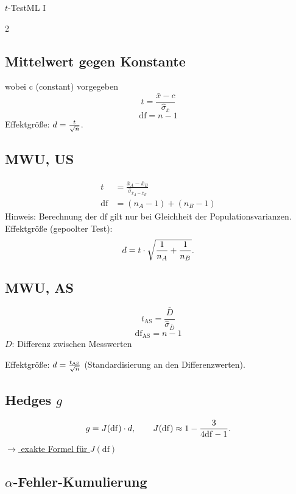 
\begin{formulaBox}{\texorpdfstring{$t$-Test}{t-Test}}{ML I}

\begin{multicols}{2}

\subsection*{Mittelwert gegen Konstante} 
wobei c (constant) vorgegeben
$$t=\frac{\bar{x}-c}{\hat{\sigma}_{\bar{x}}}$$
$$\mathrm{df}=n-1$$
Effektgröße: $d=\frac{t}{\sqrt{n}}$.

\subsection*{MWU, US} 

\begin{align*}
t&=\frac{\bar{x}_A-\bar{x}_B}{\hat{\sigma}_{\bar{x}_A-\bar{x}_B}}\\
\mathrm{df}&=(n_A-1)+(n_B-1)
\end{align*}
Hinweis: Berechnung der $\mathrm{df}$ gilt nur bei Gleichheit der Populationsvarianzen. 
Effektgröße (gepoolter Test):
\[
d=t\cdot\sqrt{\frac{1}{n_A}+\frac{1}{n_B}}.
\]

\subsection*{\textbf{MWU, AS}}
$$t_{\mathrm{AS}}=\frac{\bar{D}}{\hat{\sigma}_{\bar{D}}}$$
$$\mathrm{df}_{\mathrm{AS}}=n-1$$
$D$: Differenz zwischen Messwerten
\par Effektgröße: $d=\frac{t_{\mathrm{AS}}}{\sqrt{n}}$ (Standardisierung an den Differenzwerten).

\columnbreak
\subsection*{\textbf{Hedges $g$}}
\[
g=J(\mathrm{df})\cdot d,\qquad J(\mathrm{df})\approx1-\frac{3}{4\mathrm{df}-1}.
\]
\hyperref[formel:hedges-j]{$\rightarrow$ exakte Formel für $J(\mathrm{df})$}

\subsection*{$\alpha$-Fehler-Kumulierung}


\end{multicols}
\end{formulaBox}
